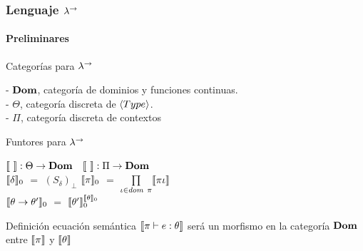 \documentclass{beamer}
\begin{document}
\begin{frame}
\frametitle{Lenguaje $\lambda^{\rightarrow}$}
\framesubtitle{Preliminares}

\begin{block}{Categorías para $\lambda^{\rightarrow}$}

- $\textbf{Dom}$, categoría de dominios y funciones continuas.\\
- $\Theta$, categoría discreta de $\langle Type \rangle$.\\
- $\Pi$, categoría discreta de contextos

\end{block}

\pause

\begin{block}{Funtores para $\lambda^{\rightarrow}$}

$\llbracket  \  \rrbracket : \Theta \rightarrow \textbf{Dom}$ 
\quad \quad \quad \
$\llbracket  \  \rrbracket : \Pi \rightarrow \textbf{Dom}$\\
$\llbracket \delta \rrbracket_0$ $=$ $(S_\delta)_\bot$
\quad \quad \quad \quad
$\llbracket \pi \rrbracket_0$ $=$ $\prod\limits_{\iota \in dom \ \pi} \llbracket \pi\iota \rrbracket$\\
$\llbracket \theta \rightarrow \theta' \rrbracket_0$ $=$ $\llbracket \theta' \rrbracket_0^{\llbracket \theta \rrbracket_0}$

\end{block}

\pause

\begin{block}{Definición ecuación semántica}
$\llbracket \pi \vdash e : \theta \rrbracket$ será un morfismo en la categoría $\textbf{Dom}$ entre
$\llbracket \pi \rrbracket$ y $\llbracket \theta \rrbracket$
\end{block}

\end{frame}
\end{document}
